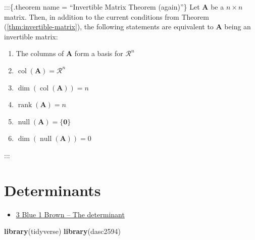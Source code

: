 \documentclass[
]{book}
\newenvironment{Shaded}{\begin{snugshade}}{\end{snugshade}}
\newcommand{\KeywordTok}[1]{\textcolor[rgb]{0.13,0.29,0.53}{\textbf{#1}}}
\newcommand{\NormalTok}[1]{#1}
\providecommand{\tightlist}{%
  \setlength{\itemsep}{0pt}\setlength{\parskip}{0pt}}
\theoremstyle{definition}
\theoremstyle{definition}
\theoremstyle{definition}
\theoremstyle{remark}
\begin{document}
:::\{.theorem name = ``Invertible Matrix Theorem (again)''\}
Let \(\mathbf{A}\) be a \(n \times n\) matrix. Then, in addition to the current conditions from Theorem (\ref{thm:invertible-matrix}), the following statements are equivalent to \(\mathbf{A}\) being an invertible matrix:

\begin{enumerate}
\def\labelenumi{\alph{enumi})}
\item
  The columns of \(\mathbf{A}\) form a basis for \(\mathcal{R}^n\)
\item
  \(\operatorname{col}(\mathbf{A}) = \mathcal{R}^n\)
\item
  \(\operatorname{dim}(\operatorname{col}(\mathbf{A})) = n\)
\item
  \(\operatorname{rank}(\mathbf{A}) = n\)
\item
  \(\operatorname{null}(\mathbf{A}) = \{\mathbf{0}\}\)
\item
  \(\operatorname{dim}(\operatorname{null}(\mathbf{A})) = 0\)
\end{enumerate}

:::

\hypertarget{determinants}{%
\chapter{Determinants}\label{determinants}}

\begin{itemize}
\tightlist
\item
  \href{https://www.3blue1brown.com/lessons/determinant}{3 Blue 1 Brown -- The determinant}
\end{itemize}

\begin{Shaded}
\begin{Highlighting}[]
\KeywordTok{library}\NormalTok{(tidyverse)}
\KeywordTok{library}\NormalTok{(dasc2594)}
\end{Highlighting}
\end{Shaded}
\end{document}
